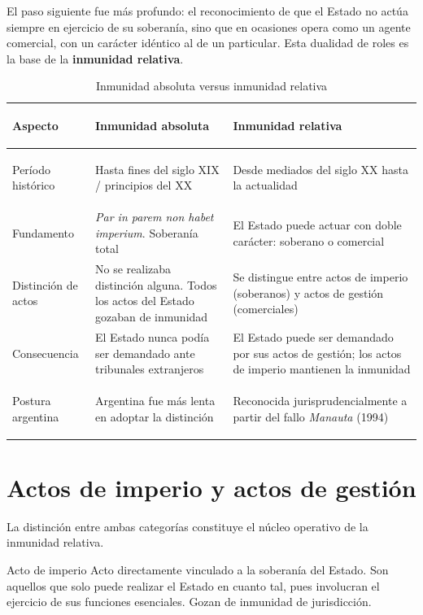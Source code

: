 \documentclass[12pt,oneside]{book}
\begin{document}
El paso siguiente fue más profundo: el reconocimiento de que el Estado no actúa siempre en ejercicio de su soberanía, sino que en ocasiones opera como un agente comercial, con un carácter idéntico al de un particular. Esta dualidad de roles es la base de la \textbf{inmunidad relativa}.

\begin{table}[H]
\centering
\caption{Inmunidad absoluta versus inmunidad relativa}
\begin{tabularx}{\textwidth}{
    >{\bfseries\raggedright\arraybackslash}p{}
    >{\raggedright\arraybackslash}X
    >{\raggedright\arraybackslash}X
}
\toprule
\textbf{Aspecto} & \textbf{Inmunidad absoluta} & \textbf{Inmunidad relativa} \\
\midrule
Período histórico & Hasta fines del siglo XIX / principios del XX & Desde mediados del siglo XX hasta la actualidad \\
\addlinespace
Fundamento & \textit{Par in parem non habet imperium}. Soberanía total & El Estado puede actuar con doble carácter: soberano o comercial \\
\addlinespace
Distinción de actos & No se realizaba distinción alguna. Todos los actos del Estado gozaban de inmunidad & Se distingue entre actos de imperio (soberanos) y actos de gestión (comerciales) \\
\addlinespace
Consecuencia & El Estado nunca podía ser demandado ante tribunales extranjeros & El Estado puede ser demandado por sus actos de gestión; los actos de imperio mantienen la inmunidad \\
\addlinespace
Postura argentina & Argentina fue más lenta en adoptar la distinción & Reconocida jurisprudencialmente a partir del fallo \textit{Manauta} (1994) \\
\bottomrule
\end{tabularx}
\end{table}

\section{Actos de imperio y actos de gestión}

La distinción entre ambas categorías constituye el núcleo operativo de la inmunidad relativa.

\begin{definition}{Acto de imperio}
Acto directamente vinculado a la soberanía del Estado. Son aquellos que solo puede realizar el Estado en cuanto tal, pues involucran el ejercicio de sus funciones esenciales. Gozan de inmunidad de jurisdicción.
\end{definition}
\end{document}
